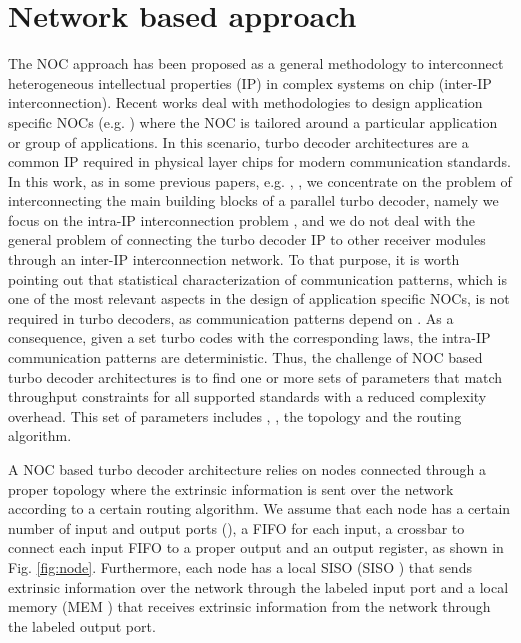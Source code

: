 \documentclass[10pt,twocolumn,journal]{IEEEtran}
\begin{document}
\section{Network based approach}
\label{sec:noc}

The NOC approach \cite{beniniNOC} has been proposed as a general methodology to interconnect heterogeneous 
intellectual properties (IP) in complex systems on chip (inter-IP interconnection). 
Recent works deal with methodologies to design application specific NOCs (e.g. \cite{benini_date06}) 
where the NOC is tailored around a particular application or group of applications. 
In this scenario, turbo decoder architectures are a common IP required in physical layer chips for modern communication 
standards. 
In this work, as in some previous papers, e.g. \cite{wehn_icecs02}, \cite{wehn_iscas05}, \cite{moussa_iscas08} 
we concentrate on the problem of interconnecting the main building blocks of a parallel 
turbo decoder, namely 
we focus on the intra-IP interconnection problem \cite{vacca_DSD09}, and we do not deal with the general problem of connecting the 
turbo decoder IP to other receiver modules through an inter-IP interconnection network. 
To that purpose, it is worth pointing out that statistical characterization of 
communication patterns, which is one of the most relevant aspects in the design of application specific NOCs, 
is not required in turbo decoders, as communication patterns depend on .
As a consequence, given a set turbo codes with the corresponding  laws, the intra-IP communication patterns are 
deterministic. Thus, the challenge of NOC based turbo decoder architectures is to find one or more sets of parameters that
match throughput constraints for all supported standards 
with a reduced complexity overhead. This set of parameters includes 
, , the topology and the routing algorithm. 

A NOC based turbo decoder architecture relies on  nodes connected through a proper topology where the 
extrinsic information is sent over the network according to a certain routing algorithm. We assume that 
each node has a certain number of input and output ports (), 
a FIFO for each input, 
a crossbar to connect each input FIFO to a proper output 
and an output register, as shown in Fig. \ref{fig:node}. 
Furthermore, each node has a local SISO (SISO ) that sends extrinsic information over the network through 
the  labeled input port and a local memory (MEM ) that receives extrinsic information from the network 
through the  labeled output port. 
\end{document}
